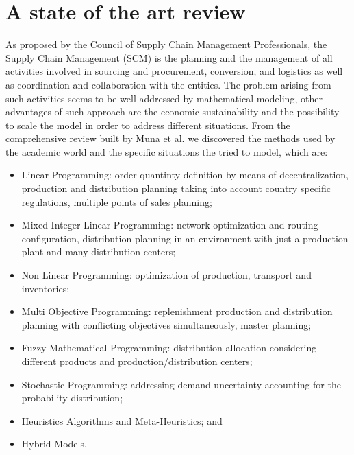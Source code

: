 \documentclass{article}
\begin{document}
\section{A state of the art review }
  As proposed by the Council of Supply Chain Management Professionals, the Supply Chain Management (SCM) is the planning and the management of all activities involved in sourcing and procurement, conversion, and logistics as well as coordination and collaboration with the entities. The problem arising from such activities seems to be well addressed by mathematical modeling, other advantages of such approach are the economic sustainability and the possibility to scale the model in order to address different situations.
  From the comprehensive review built by Muna et al. \cite{mula_mathematical_2010} we discovered the methods used by the academic world and the specific situations the tried to model, which are:
  \begin{itemize}
	  \item Linear Programming: order quantinty definition by means of decentralization\cite{jung_order_2008}, production and distribution planning taking into account country specific regulations\cite{Oh_Karimi_2006}, multiple points of sales planning\cite{Kanyalkar_2005};
	  \item Mixed Integer Linear Programming: network optimization and routing configuration\cite{romo_optimizing_2009}, distribution planning in an environment with just a production plant and many distribution centers\cite{Rizk_Martel2008};
    \item Non Linear Programming: optimization of production, transport and inventories\cite{benjamin_analysis_1989};
    \item Multi Objective Programming: replenishment production and distribution planning with conflicting objectives simultaneously\cite{torabi_interactive_2008}, master planning\cite{Chern_Hsieh_2007};
    \item Fuzzy Mathematical Programming: distribution allocation considering different products and production/distribution centers\cite{Liang_Cheng_2009};
    \item Stochastic Programming: addressing demand uncertainty accounting for the probability distribution\cite{Gupta_Maranas_2003};
    \item Heuristics Algorithms and Meta-Heuristics; and
    \item Hybrid Models.
  \end{itemize}
\end{document}
